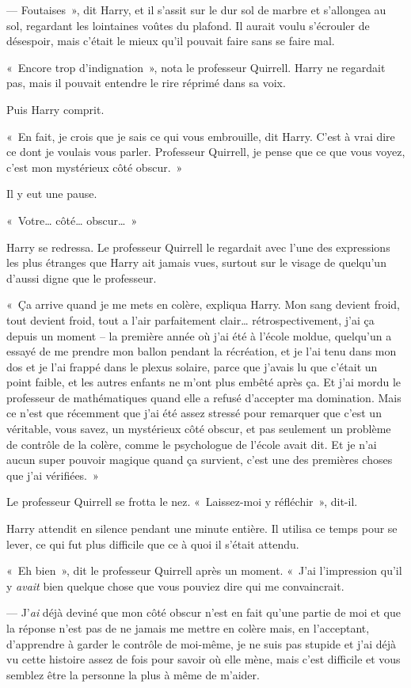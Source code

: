 --- Foutaises~», dit Harry, et il s'assit sur le dur sol de marbre et s'allongea au sol, regardant les lointaines voûtes du plafond. Il aurait voulu s'écrouler de désespoir, mais c'était le mieux qu'il pouvait faire sans se faire mal.

«~Encore trop d'indignation~», nota le professeur Quirrell. Harry ne regardait pas, mais il pouvait entendre le rire réprimé dans sa voix.

Puis Harry comprit.

«~En fait, je crois que je sais ce qui vous embrouille, dit Harry. C'est à vrai dire ce dont je voulais vous parler. Professeur Quirrell, je pense que ce que vous voyez, c'est mon mystérieux côté obscur.~»

Il y eut une pause.

«~Votre… côté… obscur…~»

Harry se redressa. Le professeur Quirrell le regardait avec l'une des expressions les plus étranges que Harry ait jamais vues, surtout sur le visage de quelqu'un d'aussi digne que le professeur.

«~Ça arrive quand je me mets en colère, expliqua Harry. Mon sang devient froid, tout devient froid, tout a l'air parfaitement clair… rétrospectivement, j'ai ça depuis un moment -- la première année où j'ai été à l'école moldue, quelqu'un a essayé de me prendre mon ballon pendant la récréation, et je l'ai tenu dans mon dos et je l'ai frappé dans le plexus solaire, parce que j'avais lu que c'était un point faible, et les autres enfants ne m'ont plus embêté après ça. Et j'ai mordu le professeur de mathématiques quand elle a refusé d'accepter ma domination. Mais ce n'est que récemment que j'ai été assez stressé pour remarquer que c'est un véritable, vous savez, un mystérieux côté obscur, et pas seulement un problème de contrôle de la colère, comme le psychologue de l'école avait dit. Et je n'ai aucun super pouvoir magique quand ça survient, c'est une des premières choses que j'ai vérifiées.~»

Le professeur Quirrell se frotta le nez. «~Laissez-moi y réfléchir~», dit-il.

Harry attendit en silence pendant une minute entière. Il utilisa ce temps pour se lever, ce qui fut plus difficile que ce à quoi il s'était attendu.

«~Eh bien~», dit le professeur Quirrell après un moment. «~J'ai l'impression qu'il y \emph{avait} bien quelque chose que vous pouviez dire qui me convaincrait.

--- J'\emph{ai} déjà deviné que mon côté obscur n'est en fait qu'une partie de moi et que la réponse n'est pas de ne jamais me mettre en colère mais, en l'acceptant, d'apprendre à garder le contrôle de moi-même, je ne suis pas stupide et j'ai déjà vu cette histoire assez de fois pour savoir où elle mène, mais c'est difficile et vous semblez être la personne la plus à même de m'aider.

